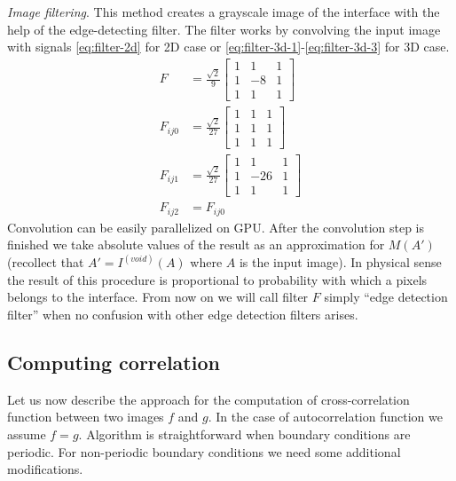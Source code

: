 \documentclass[reprint,amsmath,amssymb,aps,pre,showkeys,showpacs]{revtex4-1}
\begin{document}
\textit{Image filtering}. This method creates a grayscale image of the interface
with the help of the edge-detecting filter. The filter works by convolving the
input image with signals \cref{eq:filter-2d} for 2D case or
\cref{eq:filter-3d-1}-\cref{eq:filter-3d-3} for 3D case.
\begin{align}
  F &= \frac{\sqrt{2}}{9} \left[
    \begin{array}{ccc}
        1 & 1 & 1 \\
        1 & -8 & 1 \\
        1 & 1 & 1
      \end{array}
    \right] \label{eq:filter-2d} \\
  F_{ij0} &= \frac{\sqrt{2}}{27} \left[
    \begin{array}{ccc}
        1 & 1 & 1 \\
        1 & 1 & 1 \\
        1 & 1 & 1
    \end{array}
    \right] \label{eq:filter-3d-1} \\
  F_{ij1} &= \frac{\sqrt{2}}{27} \left[
    \begin{array}{ccc}
      1 & 1 & 1 \\
      1 & -26 & 1 \\
      1 & 1 & 1
    \end{array}
    \right] \label{eq:filter-3d-2} \\
  F_{ij2} &= F_{ij0} \label{eq:filter-3d-3}
\end{align}
Convolution can be easily parallelized on GPU. After the convolution step is
finished we take absolute values of the result as an approximation for $M(A')$
(recollect that $A' = I^{(void)}(A)$ where $A$ is the input image). In physical
sense the result of this procedure is proportional to probability with which a
pixels belongs to the interface. From now on we will call filter $F$ simply
``edge detection filter'' when no confusion with other edge detection filters
arises.

\subsection{Computing correlation}
\label{sec:cross-comp}
Let us now describe the approach for the computation of cross-correlation
function between two images $f$ and $g$. In the case of autocorrelation function
we assume $f = g$. Algorithm is straightforward when boundary conditions are
periodic. For non-periodic boundary conditions we need some additional
modifications.
\end{document}
